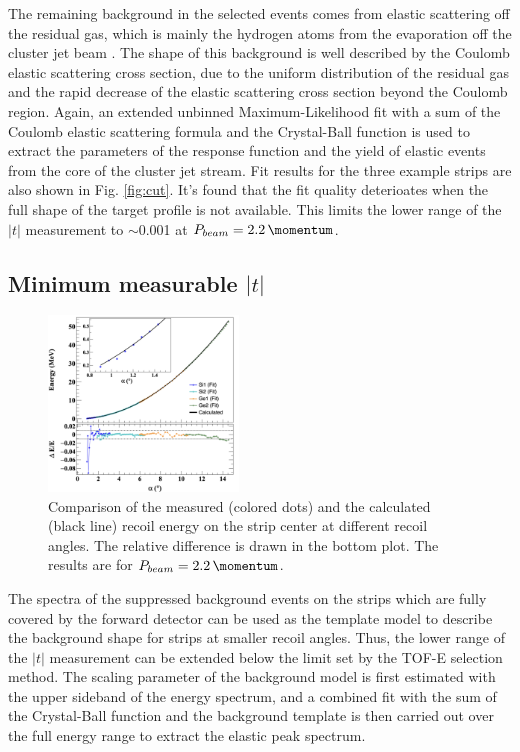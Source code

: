 \documentclass[number,5p]{elsarticle}
\begin{document}
The remaining background in the selected events comes from elastic scattering
off the residual gas, which is mainly the hydrogen atoms from the evaporation
off the cluster jet beam \cite{cluster_target}.
The shape of this background is well described by the Coulomb elastic scattering cross
section, due to the uniform distribution of the residual gas and the rapid decrease of the elastic scattering cross section beyond the Coulomb region.
Again, an extended unbinned Maximum-Likelihood fit with a sum of the Coulomb elastic scattering formula and the Crystal-Ball
function is used to extract the parameters of the response function and the
yield of elastic events from the core of the cluster jet stream. 
Fit results for the three example strips are also shown in Fig. \ref{fig:cut}.
It's found that the fit quality deterioates when the full shape of the target profile is not available.
This limits the lower range of the $|t|$ measurement to $\sim$\SI{0.001}{\tmom} at $P_{beam}=\SI{2.2}{\momentum}$.

\subsection{Minimum measurable $|t|$}
\label{sec:minimum_t}
\begin{figure}[b!]
  \centering
  \includegraphics[width=0.45\textwidth]{./e_vs_alpha_combined.png}
  \caption{
    Comparison of the measured (colored dots) and the calculated (black line)
    recoil energy on the strip center at different recoil angles. The relative
    difference is drawn in the bottom plot. The results are for $P_{beam} = \SI{2.2}{\momentum}$.}
  \label{fig:measured_vs_calculated}
\end{figure}
The spectra of the suppressed background events on the strips which are fully covered by the
forward detector can be used as the template model to describe the background
shape for strips at smaller recoil angles.
Thus, the lower range of the $|t|$ measurement can be extended below the limit set by the TOF-E selection method.
The scaling parameter of the background model is first estimated with the upper
sideband of the energy spectrum, and a combined fit with the sum of the Crystal-Ball function and the background template is then carried
out over the full energy range to extract the elastic peak spectrum.
\end{document}
